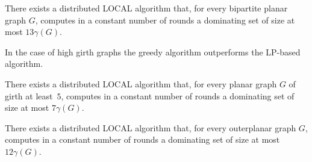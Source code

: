 \begin{theorem}\label{thm:bip-2}
  There exists a distributed LOCAL algorithm that, for every bipartite planar graph
  $G$, computes in a constant number of rounds a
  dominating set of size at most $13\gamma(G)$.
\end{theorem}

In the case of high girth graphs the greedy algorithm outperforms the
LP-based algorithm.

\begin{theorem}\label{thm:girth-2}
  There exists a distributed LOCAL algorithm that, for every planar graph
  $G$ of girth at least~$5$, computes in a constant number of rounds a
  dominating set of size at most $7\gamma(G)$.
\end{theorem}

\begin{theorem}\label{thm:outer-2}
  There exists a distributed LOCAL algorithm that, for every outerplanar graph
  $G$, computes in a constant number of rounds a
  dominating set of size at most $12\gamma(G)$.
\end{theorem}



